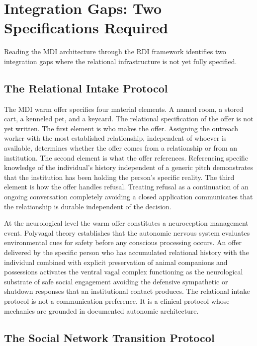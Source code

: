 \documentclass[12pt, letterpaper]{article}
\begin{document}
\clearpage
\section{Integration Gaps: Two Specifications Required}

Reading the MDI architecture through the RDI framework identifies two integration gaps where the relational infrastructure is not yet fully specified.

\subsection{The Relational Intake Protocol}

The MDI warm offer specifies four material elements. A named room, a stored cart, a kenneled pet, and a keycard. The relational specification of the offer is not yet written. The first element is who makes the offer. Assigning the outreach worker with the most established relationship, independent of whoever is available, determines whether the offer comes from a relationship or from an institution. The second element is what the offer references. Referencing specific knowledge of the individual's history independent of a generic pitch demonstrates that the institution has been holding the person's specific reality. The third element is how the offer handles refusal. Treating refusal as a continuation of an ongoing conversation completely avoiding a closed application communicates that the relationship is durable independent of the decision.

At the neurological level the warm offer constitutes a neuroception management event. Polyvagal theory \citep{porges_2011} establishes that the autonomic nervous system evaluates environmental cues for safety before any conscious processing occurs. An offer delivered by the specific person who has accumulated relational history with the individual combined with explicit preservation of animal companions and possessions activates the ventral vagal complex functioning as the neurological substrate of safe social engagement avoiding the defensive sympathetic or shutdown responses that an institutional contact produces. The relational intake protocol is not a communication preference. It is a clinical protocol whose mechanics are grounded in documented autonomic architecture.

\subsection{The Social Network Transition Protocol}
\end{document}

